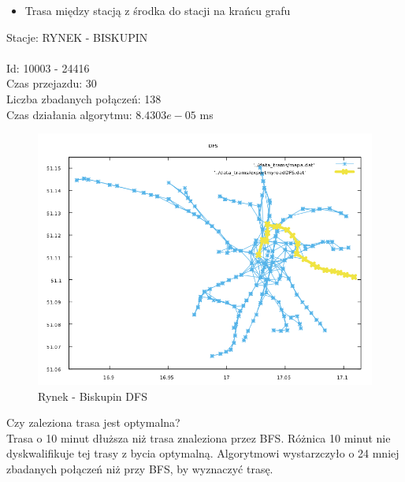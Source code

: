 \documentclass[13pt]{article}
\begin{document}
\newpage
\begin{itemize}
\item Trasa między stacją z środka do stacji na krańcu grafu
\end{itemize}
\hspace{1.5cm} Stacje: RYNEK - BISKUPIN\\\\
Id: 10003 - 24416\\
Czas przejazdu: 30\\
Liczba zbadanych połączeń: 138\\
Czas działania algorytmu: $8.4303e-05$ ms\\
\begin{figure}[hp]
\centering
\includegraphics[width=1\textwidth]{wykresy/RYN_BIS_DFS.png}
\caption{Rynek - Biskupin DFS}
\end{figure}

Czy zaleziona trasa jest optymalna?\\
Trasa o 10 minut dłuższa niż trasa znaleziona przez BFS. Różnica 10 minut nie dyskwalifikuje tej trasy z bycia optymalną. Algorytmowi wystarzczyło o 24 mniej zbadanych połączeń niż przy BFS, by wyznaczyć trasę.
\end{document}
